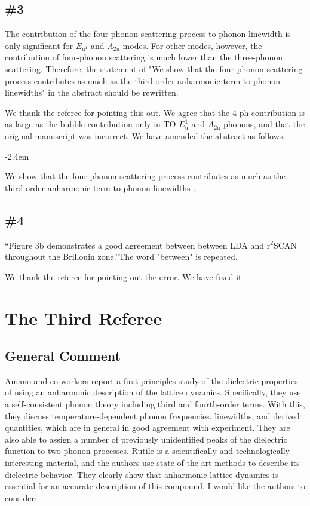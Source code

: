 \documentclass[luatex,onecolumn,showpacs,aps,preprint,prb,amsfonts,amsmath,amssymb,floatfix,groupedaddress, longbibliography]{revtex4-2}
\renewenvironment{quote}{\begin{fquote}\advance\leftmargini -2.4em\begin{oldquote}}{\end{oldquote}\end{fquote}}
\newenvironment{fquote}
  {\def\FrameCommand{
	\fboxsep=0.6em %
	\fcolorbox{black}{white}}%
    \MakeFramed {\advance\hsize-2\width \FrameRestore}
    \begin{minipage}{\linewidth}
  }
  {\end{minipage}\endMakeFramed}
\providecommand{\DIFadd}[1]{{\protect\color{blue}\uwave{#1}}} %
\begin{document}
\subsection{\#3}

\RC The contribution of the four-phonon scattering process to phonon linewidth is only significant for $E_{\mathrm{u}^1}$ and $A_{\mathrm{2u}}$ modes. For other modes, however, the contribution of four-phonon scattering is much lower than the three-phonon scattering. Therefore, the statement of "We show that the four-phonon scattering process contributes as much as the third-order anharmonic term to phonon linewidths" in the abstract should be rewritten.

\AR  We thank the referee for pointing this out. We agree that the $4$-ph contribution is as large as the bubble contribution only in TO $E_{\mathrm{u}}^{1}$ and $A_{\mathrm{2u}}$ phonons, and that the original manuscript was incorrect. We have amended the abstract as follows:

\begin{quote}
 We show that the four-phonon scattering process contributes as much as the third-order anharmonic term to phonon linewidths \DIFadd{of some phonon modes}.
\end{quote}

\subsection{\#4}

\RC “Figure 3b demonstrates a good agreement between between LDA and $\mathrm{r}^2$SCAN throughout the Brillouin zone.”The word "between" is repeated.

\AR  We thank the referee for pointing out the error. We have fixed it.


% 
% 

\newpage
\section{The Third Referee}

\subsection{General Comment}

\RC Amano and co-workers report a first principles study of the dielectric properties of  using an anharmonic description of the lattice
dynamics. Specifically, they use a self-consistent phonon theory including third and fourth-order terms. With this, they discuss temperature-dependent phonon frequencies, linewidths, and derived quantities, which are in general in good agreement with experiment. They are also able to assign a number of previously unidentified peaks of the dielectric function to two-phonon processes. 
Rutile  is a scientifically and technologically interesting material, and the authors use state-of-the-art methods to describe its dielectric behavior. They clearly show that anharmonic lattice dynamics is essential for an accurate description of this compound. I would like the authors to consider:
\end{document}
